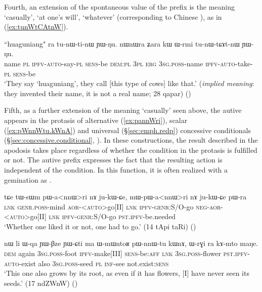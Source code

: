 Fourth, an extension of the spontaneous value of the prefix  is the meaning `casually', `at one's will', `whatever' (corresponding to Chinese ), as in (\ref{ex:tunWtCAtnW}). 

\begin{exe}
\ex \label{ex:tunWtCAtnW}
\gll ``huaguniang" ra tu-nɯ-ti-nɯ ɲɯ-ŋu. nɯnɯra ʑara kɯ ɯ-rmi tu-nɯ-tɕɤt-nɯ ɲɯ-ŋu.  \\
name \textsc{pl}	\textsc{ipfv}-\textsc{auto}-say-\textsc{pl}	\textsc{sens}-be	\textsc{dem}:\textsc{pl}	\textsc{3pl}	\textsc{erg}	\textsc{3sg}.\textsc{poss}-name	\textsc{ipfv}-\textsc{auto}-take-\textsc{pl}	\textsc{sens}-be\\
\glt `They say `huaguniang', they call [this type of cows] like that.' (\textit{implied meaning}: they invented their name, it is not a real name; 28 qapar) ()
\end{exe}

Fifth, as a further extension of the meaning `casually' seen above, the autive appears in the protasis of alternative (\ref{ex:pannWri}), scalar (\ref{ex:pWnnWtu.kWnA}) and universal (§\ref{sec:emph.redp}) concessive conditionals (§\ref{sec:concessive.conditional}, \citealt[298--300]{jacques14linking}). In these constructions, the result described in the apodosis takes place regardless of whether the condition in the protasis is fulfilled or not. The autive prefix expresses the fact that the resulting action is independent of the condition. In this function, it is often realized with a gemination as .

\begin{exe}
\ex  \label{ex:pannWri}
\gll tɕe tɯ-sɯm pɯ-a<nnɯ>ri nɤ ju-kɯ-ɕe, mɯ-pɯ-a<nnɯ>ri nɤ ju-kɯ-ɕe pɯ-ra \\
\textsc{lnk} \textsc{genr}.\textsc{poss}-mind  \textsc{aor}-<\textsc{auto}>go[II] \textsc{lnk} \textsc{ipfv}-\textsc{genr}:S/O-go \textsc{neg}-\textsc{aor}-<\textsc{auto}>go[II] \textsc{lnk} \textsc{ipfv}-\textsc{genr}:S/O-go \textsc{pst}.\textsc{ipfv}-be.needed \\
\glt `Whether one liked it or not, one had to go.' (14 tApi taRi) ()
\end{exe}

 \begin{exe}
\ex  \label{ex:pWnnWtu.kWnA}
\gll nɯ li ɯ-qa ɲɯ-βze ɲɯ-ɕti ma ɯ-mɯntoʁ pɯ-nnɯ-tu kɯnɤ, ɯ-rɣi ra kɤ-mto maŋe.  \\
\textsc{dem} again \textsc{3sg}.\textsc{poss}-foot \textsc{ipfv}-make[III] \textsc{sens}-be:\textsc{aff} \textsc{lnk} \textsc{3sg}.\textsc{poss}-flower \textsc{pst}.\textsc{ipfv}-\textsc{auto}-exist also \textsc{3sg}.\textsc{poss}-seed \textsc{pl} \textsc{inf}-see not.exist:\textsc{sens} \\
\glt `This one also grows by its root, as even if it has flowers, [I] have never seen its seeds.' (17 ndZWnW)
()
\end{exe}

